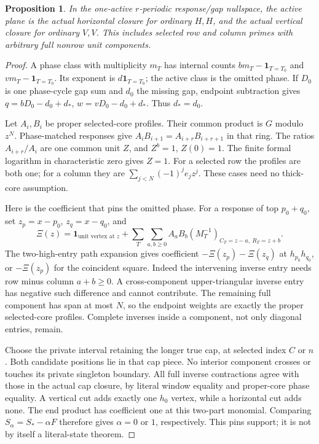 \documentclass[11pt,a4paper]{amsart}
\numberwithin{equation}{section}
\theoremstyle{plain}
\newtheorem{proposition}[theorem]{Proposition}
\theoremstyle{definition}
\begin{document}
\begin{proposition}\label{prop:closure-pin}
In the one-active \(r\)-periodic response/gap nullspace, the active plane is the actual horizontal closure for ordinary \(H,H\), and the actual vertical closure for ordinary \(V,V\).  This includes selected row and column primes with arbitrary full nonrow unit components.
\end{proposition}
\begin{proof}
A phase class with multiplicity \(m_T\) has internal counts \(bm_T-\mathbf1_{T=T_0}\) and \(vm_T-\mathbf1_{T=T_0}\).  Its exponent is \(d\mathbf1_{T=T_0}\); the active class is the omitted phase.  If \(D_0\) is one phase-cycle gap sum and \(d_0\) the missing gap, endpoint subtraction gives
\(q=bD_0-d_0+d_*\), \(w=vD_0-d_0+d_*\).
Thus \(d_*=d_0\).

Let \(A_i,B_i\) be proper selected-core profiles.  Their common product is \(G\) modulo \(z^N\).  Phase-matched responses give \(A_iB_{i+1}=A_{i+r}B_{i+r+1}\) in that ring.  The ratios \(A_{i+r}/A_i\) are one common unit \(Z\), and \(Z^b=1\), \(Z(0)=1\).  The finite formal logarithm in characteristic zero gives \(Z=1\).  For a selected row the profiles are both one; for a column they are \(\sum_{j<N}(-1)^je_jz^j\).  These cases need no thick-core assumption.

Here is the coefficient that pins the omitted phase.  For a response of top \(p_0+q_0\), set \(z_p=x-p_0\), \(z_q=x-q_0\), and
\[
 \Xi(z)=\mathbf1_{\text{unit vertex at }z}
 +\sum_T\sum_{a,b\ge0}A_aB_b
 (M_T^{-1})_{C_T=z-a,\ R_T=z+b}.
\]
The two-high-entry path expansion gives coefficient \(-\Xi(z_p)-\Xi(z_q)\) at \(h_{p_0}h_{q_0}\), or \(-\Xi(z_p)\) for the coincident square.  Indeed the intervening inverse entry needs row minus column \(a+b\ge0\).  A cross-component upper-triangular inverse entry has negative such difference and cannot contribute.  The remaining full component has span at most \(N\), so the endpoint weights are exactly the proper selected-core profiles.  Complete inverses inside a component, not only diagonal entries, remain.

Choose the private interval retaining the longer true cap, at selected index \(C\) or \(n\).  Both candidate positions lie in that cap piece.  No interior component crosses or touches its private singleton boundary.  All full inverse contractions agree with those in the actual cap closure, by literal window equality and proper-core phase equality.  A vertical cut adds exactly one \(h_0\) vertex, while a horizontal cut adds none.  The end product has coefficient one at this two-part monomial.  Comparing \(S_\alpha=S_*-\alpha F\) therefore gives \(\alpha=0\) or \(1\), respectively.  This pins support; it is not by itself a literal-state theorem.
\end{proof}
\end{document}
